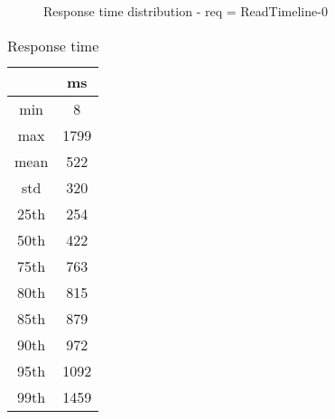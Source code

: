 \begin{minipage}{0.75\linewidth}
\begin{figure}[h]
\begin{adjustbox}{max width=1.0\linewidth, keepaspectratio}
  \end{adjustbox}
  \caption{Response time distribution - req = ReadTimeline-0}
\end{figure}
\end{minipage}\hfill\begin{minipage}{0.18\linewidth}
\begin{table}[h]
\begin{tabular}{|cc|}
\hline
\textbf{} & \textbf{ms}\\ \hline
 \Xhline{0.005\arrayrulewidth}
min & 8\\
 \Xhline{0.005\arrayrulewidth}
max & 1799\\
 \Xhline{0.005\arrayrulewidth}
mean & 522\\
 \Xhline{0.005\arrayrulewidth}
std & 320\\
\hline
\hline
 \Xhline{0.005\arrayrulewidth}
25th & 254\\
 \Xhline{0.005\arrayrulewidth}
50th & 422\\
 \Xhline{0.005\arrayrulewidth}
75th & 763\\
 \Xhline{0.005\arrayrulewidth}
80th & 815\\
 \Xhline{0.005\arrayrulewidth}
85th & 879\\
 \Xhline{0.005\arrayrulewidth}
90th & 972\\
 \Xhline{0.005\arrayrulewidth}
95th & 1092\\
 \Xhline{0.005\arrayrulewidth}
99th & 1459\\
\hline
\end{tabular}
\caption{Response time}
\end{table}
\end{minipage}\hfill